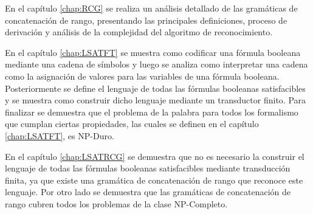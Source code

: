 \documentclass[12pt]{article}
\begin{document}
En el capítulo \ref{chap:RCG} se realiza un análisis detallado de las gramáticas de concatenación de rango, presentando las principales
definiciones, proceso de derivación y análisis de la complejidad del algoritmo de reconocimiento.

En el capítulo \ref{chap:LSATFT} se muestra como codificar una fórmula booleana mediante una cadena de símbolos y luego
se analiza como interpretar una cadena como la asignación de valores para las variables de una fórmula booleana.
Posteriormente se define el lenguaje de todas las fórmulas booleanas satisfacibles y se muestra como construir dicho
lenguaje mediante un transductor finito. Para finalizar se demuestra que el problema de la palabra para todos los formalismo que cumplan ciertas propiedades,
las cuales se definen en el capítulo \ref{chap:LSATFT}, es NP-Duro.

En el capítulo \ref{chap:LSATRCG} se demuestra que no es necesario la construir el lenguaje de todas las fórmulas
booleanas satisfacibles mediante transducción finita, ya que existe una gramática de concatenación de rango que reconoce
este lenguaje. Por otro lado se demuestra que las gramáticas de concatenación de rango cubren todos los problemas de la clase NP-Completo.
\end{document}
